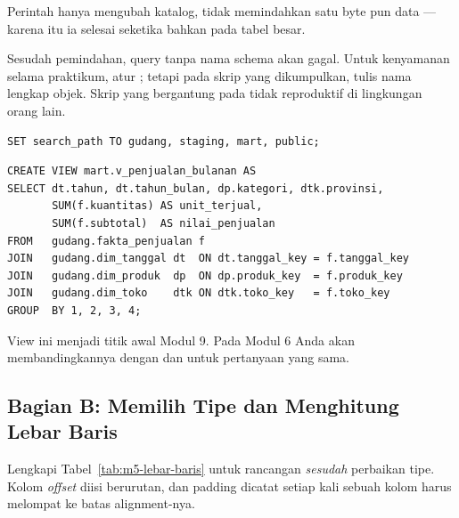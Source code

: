 Perintah  hanya mengubah katalog, tidak memindahkan satu
byte pun data --- karena itu ia selesai seketika bahkan pada tabel besar.

\begin{catatan}
Sesudah pemindahan, query tanpa nama schema akan gagal. Untuk kenyamanan
selama praktikum, atur ; tetapi pada skrip yang
dikumpulkan, tulis nama lengkap objek. Skrip yang bergantung pada
 tidak reproduktif di lingkungan orang lain.
\end{catatan}

\begin{lstlisting}[style=sqlgaya]
SET search_path TO gudang, staging, mart, public;
\end{lstlisting}


\begin{lstlisting}[style=sqlgaya]
CREATE VIEW mart.v_penjualan_bulanan AS
SELECT dt.tahun, dt.tahun_bulan, dp.kategori, dtk.provinsi,
       SUM(f.kuantitas) AS unit_terjual,
       SUM(f.subtotal)  AS nilai_penjualan
FROM   gudang.fakta_penjualan f
JOIN   gudang.dim_tanggal dt  ON dt.tanggal_key = f.tanggal_key
JOIN   gudang.dim_produk  dp  ON dp.produk_key  = f.produk_key
JOIN   gudang.dim_toko    dtk ON dtk.toko_key   = f.toko_key
GROUP  BY 1, 2, 3, 4;
\end{lstlisting}

View ini menjadi titik awal Modul 9. Pada Modul 6 Anda akan membandingkannya
dengan  dan  untuk
pertanyaan yang sama.

\subsection{Bagian B: Memilih Tipe dan Menghitung Lebar Baris}


Lengkapi Tabel~\ref{tab:m5-lebar-baris} untuk rancangan \emph{sesudah}
perbaikan tipe. Kolom \emph{offset} diisi berurutan, dan padding dicatat
setiap kali sebuah kolom harus melompat ke batas alignment-nya.

